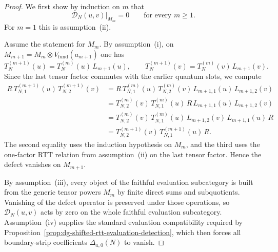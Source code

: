 \begin{proof}
We first show by induction on $m$ that
\[
\mathcal{D}_N(u,v)\big|_{M_m}=0
\qquad\text{for every } m\ge 1.
\]
For $m=1$ this is assumption~\textup{(ii)}.

Assume the statement for $M_m$.  By assumption~\textup{(i)}, on
$M_{m+1}=M_m\otimes V_{\mathrm{fund}}(a_{m+1})$ one has
\[
T_N^{(m+1)}(u)=T_N^{(m)}(u)\,L_{m+1}(u),
\qquad
T_N^{(m+1)}(v)=T_N^{(m)}(v)\,L_{m+1}(v).
\]
Since the last tensor factor commutes with the earlier quantum slots,
we compute
\begin{align*}
R\,T^{(m+1)}_{N,1}(u)\,T^{(m+1)}_{N,2}(v)
&=
R\,T^{(m)}_{N,1}(u)\,T^{(m)}_{N,2}(v)\,
L_{m+1,1}(u)\,L_{m+1,2}(v) \\
&=
T^{(m)}_{N,2}(v)\,T^{(m)}_{N,1}(u)\,
R\,L_{m+1,1}(u)\,L_{m+1,2}(v) \\
&=
T^{(m)}_{N,2}(v)\,T^{(m)}_{N,1}(u)\,
L_{m+1,2}(v)\,L_{m+1,1}(u)\,R \\
&=
T^{(m+1)}_{N,2}(v)\,T^{(m+1)}_{N,1}(u)\,R.
\end{align*}
The second equality uses the induction hypothesis on $M_m$, and the
third uses the one-factor RTT relation from assumption~\textup{(ii)} on
the last tensor factor.  Hence the defect vanishes on $M_{m+1}$.

By assumption~\textup{(iii)}, every object of the faithful evaluation
subcategory is built from the generic tensor powers $M_m$ by finite
direct sums and subquotients.  Vanishing of the defect operator is
preserved under those operations, so $\mathcal{D}_N(u,v)$ acts by zero
on the whole faithful evaluation subcategory.  Assumption~\textup{(iv)}
supplies the standard evaluation compatibility required by
Proposition~\ref{prop:dg-shifted-rtt-evaluation-detection}, which then
forces all boundary-strip coefficients $\Delta_{a,0}(N)$ to vanish.
\end{proof}

